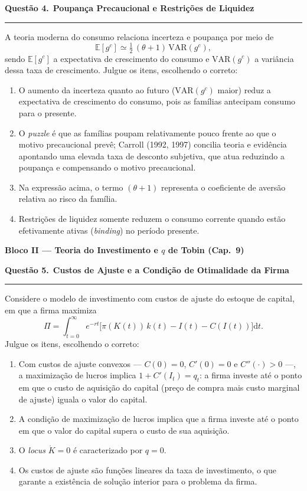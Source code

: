 \documentclass[12pt, a4paper]{article}
\newcommand{\E}{\mathbb{E}}
\newcommand{\dif}{\mathrm{d}}
\newcommand{\VAR}{\mathrm{VAR}}
\newcommand{\provaquestao}[2]{%
  \par\vspace{0.9em}%
  {\large\bfseries\color{cyanrbc} Questão #1.}\ {\bfseries #2}\par
  \vspace{-0.45em}\rule{\linewidth}{0.4pt}\par\vspace{0.1em}}
\begin{document}
\provaquestao{4}{Poupança Precaucional e Restrições de Liquidez}

A teoria moderna do consumo relaciona incerteza e poupança por meio de
\[
\E[g^c] \simeq \tfrac{1}{2}\,(\theta + 1)\,\VAR(g^c),
\]
sendo $\E[g^c]$ a expectativa de crescimento do consumo e $\VAR(g^c)$ a
variância dessa taxa de crescimento. Julgue os itens, escolhendo o correto:

\begin{enumerate}[label=\alph*)]
\item O aumento da incerteza quanto ao futuro ($\VAR(g^c)$ maior) reduz a
expectativa de crescimento do consumo, pois as famílias antecipam consumo para
o presente.
\item O \emph{puzzle} é que as famílias poupam relativamente pouco frente ao
que o motivo precaucional prevê; Carroll (1992, 1997) concilia teoria e
evidência apontando uma elevada taxa de desconto subjetiva, que atua reduzindo
a poupança e compensando o motivo precaucional.
\item Na expressão acima, o termo $(\theta + 1)$ representa o coeficiente de
aversão relativa ao risco da família.
\item Restrições de liquidez somente reduzem o consumo corrente quando estão
efetivamente ativas (\emph{binding}) no período presente.
\end{enumerate}

\begin{center}
{\large\bfseries\color{cyanrbc} Bloco II --- Teoria do Investimento e $q$ de Tobin (Cap.\ 9)}
\end{center}

\provaquestao{5}{Custos de Ajuste e a Condição de Otimalidade da Firma}

Considere o modelo de investimento com custos de ajuste do estoque de capital,
em que a firma maximiza
\[
\Pi = \int_{t=0}^{\infty} e^{-rt}\bigl[\pi(K(t))\,k(t) - I(t) - C(I(t))\bigr]\dif t.
\]
Julgue os itens, escolhendo o correto:

\begin{enumerate}[label=\alph*)]
\item Com custos de ajuste convexos --- $C(0)=0$, $C'(0)=0$ e $C''(\cdot)>0$ ---,
a maximização de lucros implica $1 + C'(I_t) = q_t$: a firma investe até o
ponto em que o custo de aquisição do capital (preço de compra mais custo
marginal de ajuste) iguala o valor do capital.
\item A condição de maximização de lucros implica que a firma investe até o
ponto em que o valor do capital supera o custo de sua aquisição.
\item O \emph{locus} $\dot{K}=0$ é caracterizado por $q = 0$.
\item Os custos de ajuste são funções lineares da taxa de investimento, o que
garante a existência de solução interior para o problema da firma.
\end{enumerate}
\end{document}
